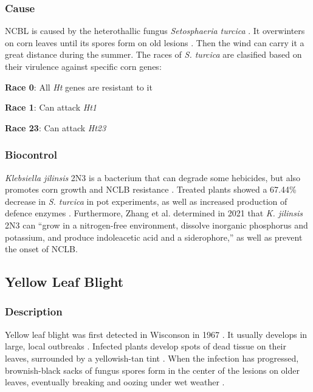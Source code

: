 \documentclass[12pt]{article}
\begin{document}
\subsubsection{Cause}

NCBL is caused by the heterothallic fungus \emph{Setosphaeria turcica} \autocite{leonard1989proposed}. It overwinters on corn leaves until its spores form on old lesions \autocite{ullstrup1961corn}. Then the wind can carry it a great distance during the summer. The races of \emph{S. turcica} are clasified based on their virulence against specific corn genes:

\textbf{Race 0}: All \emph{Ht} genes are resistant to it

\textbf{Race 1}: Can attack \emph{Ht1}

\textbf{Race 23}: Can attack \emph{Ht23}

\subsubsection{Biocontrol}

\emph{Klebsiella jilinsis} 2N3 is a bacterium that can degrade some hebicides, but also promotes corn growth and NCLB resistance \autocite{zhang2021klebsiella}. Treated plants showed a 67.44\% decrease in \emph{S. turcica} in pot experiments, as well as increased production of defence enzymes \autocite{zhang2021klebsiella}. Furthermore, Zhang et al. determined in 2021 that \emph{K. jilinsis} 2N3 can ``grow in a nitrogen-free environment, dissolve inorganic phosphorus and potassium, and produce indoleacetic acid and a siderophore,'' as well as prevent the onset of NCLB.


\subsection{Yellow Leaf Blight}

\subsubsection{Description}

Yellow leaf blight was first detected in Wisconson in 1967 \autocite{comstock1973host}. It usually develops in large, local outbreaks \autocite{arny1971phyllosticta}. Infected plants develop spots of dead tissue on their leaves, surrounded by a yellowish-tan tint \autocite{ullstrup1961corn}. When the infection has progressed, brownish-black sacks of fungus spores form in the center of the lesions on older leaves, eventually breaking and oozing under wet weather \autocite{ullstrup1961corn}.
\end{document}
